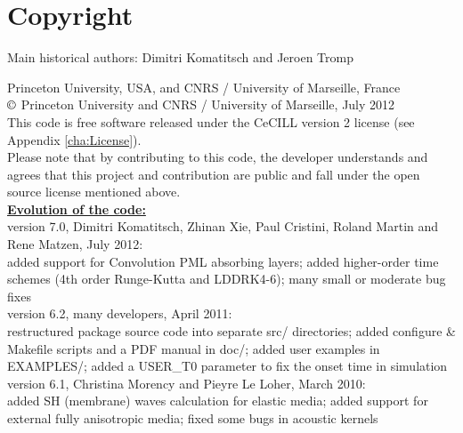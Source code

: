 
\chapter*{Copyright}


Main historical authors: Dimitri Komatitsch and Jeroen Tromp

Princeton University, USA, and CNRS / University of Marseille, France\\
$\copyright$ Princeton University and CNRS / University of Marseille, July 2012\\

\noindent
This code is free software released under the CeCILL version 2 license (see Appendix \ref{cha:License}).\\ 

\noindent
Please note that by contributing to this code, the developer understands and agrees that this project and contribution
are public and fall under the open source license mentioned above.\\

\noindent
\textbf{\underline{Evolution of the code:}}\\

version 7.0, Dimitri Komatitsch, Zhinan Xie, Paul Cristini, Roland Martin and Rene Matzen, July 2012:\\
added support for Convolution PML absorbing layers;
added higher-order time schemes (4th order Runge-Kutta and LDDRK4-6);
many small or moderate bug fixes\\

version 6.2, many developers, April 2011:\\
restructured package source code into separate src/ directories;
added configure \& Makefile scripts and a PDF manual in doc/;
added user examples in EXAMPLES/;
added a USER\_T0 parameter to fix the onset time in simulation\\

version 6.1, Christina Morency and Pieyre Le Loher, March 2010:\\
added SH (membrane) waves calculation for elastic media;
added support for external fully anisotropic media;
fixed some bugs in acoustic kernels\\

